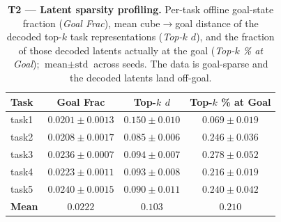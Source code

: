 \begin{table}[htbp]
\centering
\small
\caption{\textbf{T2 --- Latent sparsity profiling.} Per-task offline
goal-state fraction (\emph{Goal Frac}), mean cube$\to$goal distance of
the decoded top-$k$ task representations (\emph{Top-$k$ $d$}), and the
fraction of those decoded latents actually at the goal
(\emph{Top-$k$ \% at Goal}); $\text{mean}\pm\text{std}$ across seeds.
The data is goal-sparse and the decoded latents land off-goal.}
\label{tab:T2_sparsity}
\vspace{0.5em}
\begin{tabular}{lccc}
\toprule
\textbf{Task} & \textbf{Goal Frac} & \textbf{Top-$k$ $d$} & \textbf{Top-$k$ \% at Goal} \\
\midrule
task1 & $0.0201 \pm 0.0013$ & $0.150 \pm 0.010$ & $0.069 \pm 0.019$ \\
task2 & $0.0208 \pm 0.0017$ & $0.085 \pm 0.006$ & $0.246 \pm 0.036$ \\
task3 & $0.0236 \pm 0.0007$ & $0.094 \pm 0.007$ & $0.278 \pm 0.052$ \\
task4 & $0.0223 \pm 0.0011$ & $0.093 \pm 0.008$ & $0.216 \pm 0.019$ \\
task5 & $0.0240 \pm 0.0015$ & $0.090 \pm 0.011$ & $0.240 \pm 0.042$ \\
\midrule
\textbf{Mean} & $\mathbf{0.0222}$ & $\mathbf{0.103}$ & $\mathbf{0.210}$ \\
\bottomrule
\end{tabular}
\end{table}
